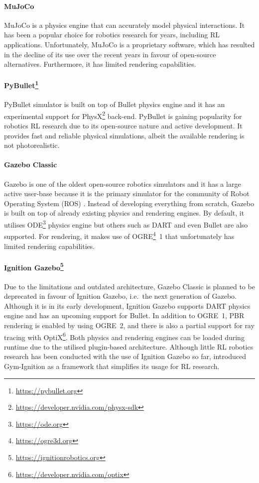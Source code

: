 \paragraph{MuJoCo~\protect\cite{todorov_mujoco_2012}} MuJoCo is a physics engine that can accurately model physical interactions. It has been a popular choice for robotics research for years, including RL applications. Unfortunately, MuJoCo is a proprietary software, which has resulted in the decline of its use over the recent years in favour of open-source alternatives. Furthermore, it has limited rendering capabilities.

\paragraph{PyBullet\protect\footnote{\href{https://pybullet.org}{https://pybullet.org}}} PyBullet simulator is built on top of Bullet physics engine and it has an experimental support for PhysX\footnote{\href{https://developer.nvidia.com/physx-sdk}{https://developer.nvidia.com/physx-sdk}} back-end. PyBullet is gaining popularity for robotics RL research due to its open-source nature and active development. It provides fast and reliable physical simulations, albeit the available rendering is not photorealistic.

\paragraph{Gazebo Classic~\protect\cite{koenig_design_2004}} Gazebo is one of the oldest open-source robotics simulators and it has a large active user-base because it is the primary simulator for the community of Robot Operating System (ROS) \cite{quigley_ros_2009}. Instead of developing everything from scratch, Gazebo is built on top of already existing physics and rendering engines. By default, it utilises ODE\footnote{\href{https://ode.org}{https://ode.org}} physics engine but others such as DART \cite{lee_dart_2018} and even Bullet are also supported. For rendering, it makes use of OGRE\footnote{\href{https://ogre3d.org}{https://ogre3d.org}}~1 that unfortunately has limited rendering capabilities.

\paragraph{Ignition Gazebo\protect\footnote{\href{https://ignitionrobotics.org}{https://ignitionrobotics.org}}} Due to the limitations and outdated architecture, Gazebo Classic is planned to be deprecated in favour of Ignition Gazebo, i.e.~the next generation of Gazebo. Although it is in its early development, Ignition Gazebo supports DART physics engine and has an upcoming support for Bullet. In addition to OGRE~1, PBR rendering is enabled by using OGRE~2, and there is also a partial support for ray tracing with OptiX\footnote{\href{https://developer.nvidia.com/optix}{https://developer.nvidia.com/optix}}. Both physics and rendering engines can be loaded during runtime due to the utilised plugin-based architecture. Although little RL robotics research has been conducted with the use of Ignition Gazebo so far, \citet{ferigo_gym-ignition_2020} introduced Gym-Ignition as a framework that simplifies its usage for RL research.

